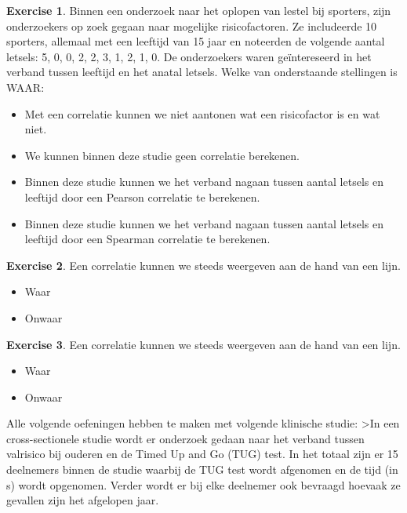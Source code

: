 \documentclass[
]{book}
\providecommand{\tightlist}{%
  \setlength{\itemsep}{0pt}\setlength{\parskip}{0pt}}
\theoremstyle{definition}
\theoremstyle{definition}
\theoremstyle{definition}
\newtheorem{exercise}{Exercise}[chapter]
\theoremstyle{definition}
\theoremstyle{remark}
\begin{document}
\begin{exercise}

Binnen een onderzoek naar het oplopen van lestel bij sporters, zijn onderzoekers op zoek gegaan naar mogelijke risicofactoren. Ze includeerde 10 sporters, allemaal met een leeftijd van 15 jaar en noteerden de volgende aantal letsels: 5, 0, 0, 2, 2, 3, 1, 2, 1, 0. De onderzoekers waren geïntereseerd in het verband tussen leeftijd en het anatal letsels. Welke van onderstaande stellingen is WAAR:

\begin{itemize}
\tightlist
\item
  Met een correlatie kunnen we niet aantonen wat een risicofactor is en wat niet.
\item
  We kunnen binnen deze studie geen correlatie berekenen.
\item
  Binnen deze studie kunnen we het verband nagaan tussen aantal letsels en leeftijd door een Pearson correlatie te berekenen.
\item
  Binnen deze studie kunnen we het verband nagaan tussen aantal letsels en leeftijd door een Spearman correlatie te berekenen.
\end{itemize}

\end{exercise}

\begin{exercise}

Een correlatie kunnen we steeds weergeven aan de hand van een lijn.

\begin{itemize}
\tightlist
\item
  Waar
\item
  Onwaar
\end{itemize}

\end{exercise}

\begin{exercise}

Een correlatie kunnen we steeds weergeven aan de hand van een lijn.

\begin{itemize}
\tightlist
\item
  Waar
\item
  Onwaar
\end{itemize}

\end{exercise}

Alle volgende oefeningen hebben te maken met volgende klinische studie: \textgreater In een cross-sectionele studie wordt er onderzoek gedaan naar het verband tussen valrisico bij ouderen en de Timed Up and Go (TUG) test. In het totaal zijn er 15 deelnemers binnen de studie waarbij de TUG test wordt afgenomen en de tijd (in s) wordt opgenomen. Verder wordt er bij elke deelnemer ook bevraagd hoevaak ze gevallen zijn het afgelopen jaar.
\end{document}
